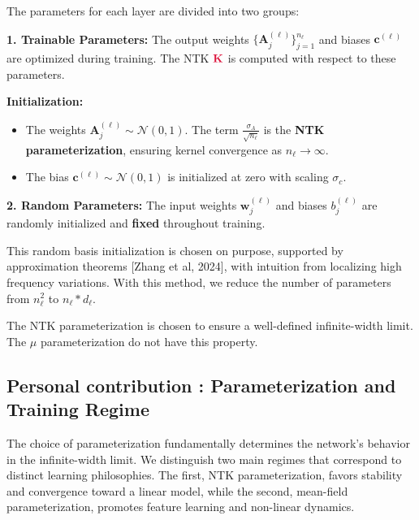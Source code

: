 \documentclass[a4paper]{article}
\newcommand{\Kop}{\textcolor{kernelcolor}{\mathbf{K}}}
\newcommand{\Kop}{\textcolor{kernelcolor}{\mathbf{K}}}
\newcommand{\Kop}{\textcolor{kernelcolor}{\mathbf{K}}}
\theoremstyle{plain}
\theoremstyle{definition}
\theoremstyle{remark}
\begin{document}
\begin{tcolorbox}[colback=blue!15,colframe=blue!80!black,title={\textbf{Remark : Parameter Classification}},enhanced,drop shadow,boxrule=2pt]
The parameters for each layer are divided into two groups:

\textbf{1. Trainable Parameters:} The output weights $\{\bm{A}_j^{(\ell)}\}_{j=1}^{n_\ell}$ and biases $\bm{c}^{(\ell)}$ are optimized during training. The NTK $\Kop $ is computed with respect to these parameters.

\textbf{Initialization:}
\begin{itemize}
\item The weights $\bm{A}_j^{(\ell)} \sim \mathcal{N}(0, 1)$. The term $\frac{\sigma_A}{\sqrt{n_\ell}}$ is the \textbf{NTK parameterization}, ensuring kernel convergence as $n_\ell \to \infty$.
\item The bias $\bm{c}^{(\ell)} \sim \mathcal{N}(0, 1)$ is initialized at zero with scaling $\sigma_c$.
\end{itemize}

\textbf{2. Random Parameters:} The input weights $\bm{w}_j^{(\ell)}$ and biases $b_j^{(\ell)}$ are randomly initialized and \textbf{fixed} throughout training.
\end{tcolorbox}



\begin{tcolorbox}[colback=green!5,colframe=green!80!black,title={\textbf{Insight : Architectural Philosophy}},enhanced,drop shadow,boxrule=2pt]
This random basis initialization is chosen on purpose, supported by approximation theorems [Zhang et al, 2024], with intuition from localizing high frequency variations.
With this method, we reduce the number of parameters from $n_\ell^2$ to $n_\ell * d_\ell$.

The NTK parameterization is chosen to ensure a well-defined infinite-width limit. The $\mu$ parameterization do not have this property.
\end{tcolorbox}



\subsection{Personal contribution : Parameterization and Training Regime}

The choice of parameterization fundamentally determines the network's behavior in the infinite-width limit. We distinguish two main regimes that correspond to distinct learning philosophies. The first, NTK parameterization, favors stability and convergence toward a linear model, while the second, mean-field parameterization, promotes feature learning and non-linear dynamics.
\end{document}
